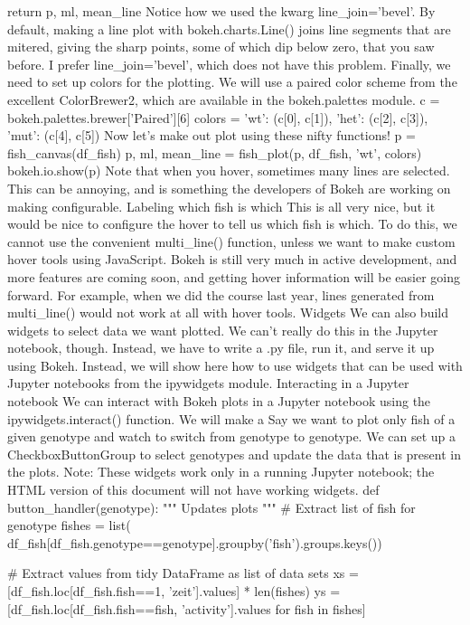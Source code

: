     return p, ml, mean_line
Notice how we used the kwarg line_join='bevel'. By default, making a line plot with bokeh.charts.Line() joins line segments that are mitered, giving the sharp points, some of which dip below zero, that you saw before. I prefer line_join='bevel', which does not have this problem.
Finally, we need to set up colors for the plotting. We will use a paired color scheme from the excellent ColorBrewer2, which are available in the bokeh.palettes module.
c = bokeh.palettes.brewer['Paired'][6]
colors = {'wt': (c[0], c[1]), 'het': (c[2], c[3]), 'mut': (c[4], c[5])}
Now let's make out plot using these nifty functions!
p = fish_canvas(df_fish)
p, ml, mean_line = fish_plot(p, df_fish, 'wt', colors)
bokeh.io.show(p)
Note that when you hover, sometimes many lines are selected. This can be annoying, and is something the developers of Bokeh are working on making configurable.
Labeling which fish is which
This is all very nice, but it would be nice to configure the hover to tell us which fish is which. To do this, we cannot use the convenient multi_line() function, unless we want to make custom hover tools using JavaScript. Bokeh is still very much in active development, and more features are coming soon, and getting hover information will be easier going forward. For example, when we did the course last year, lines generated from multi_line() would not work at all with hover tools.
Widgets
We can also build widgets to select data we want plotted. We can't really do this in the Jupyter notebook, though. Instead, we have to write a .py file, run it, and serve it up using Bokeh. Instead, we will show here how to use widgets that can be used with Jupyter notebooks from the ipywidgets module.
Interacting in a Jupyter notebook
We can interact with Bokeh plots in a Jupyter notebook using the ipywidgets.interact() function. We will make a
Say we want to plot only fish of a given genotype and watch to switch from genotype to genotype. We can set up a CheckboxButtonGroup to select genotypes and update the data that is present in the plots.
Note: These widgets work only in a running Jupyter notebook; the HTML version of this document will not have working widgets.
def button_handler(genotype):
    """
    Updates plots
    """
    # Extract list of fish for genotype
    fishes = list(
            df_fish[df_fish.genotype==genotype].groupby('fish').groups.keys())
    
    # Extract values from tidy DataFrame as list of data sets
    xs = [df_fish.loc[df_fish.fish==1, 'zeit'].values] * len(fishes)
    ys = [df_fish.loc[df_fish.fish==fish, 'activity'].values for fish in fishes]

